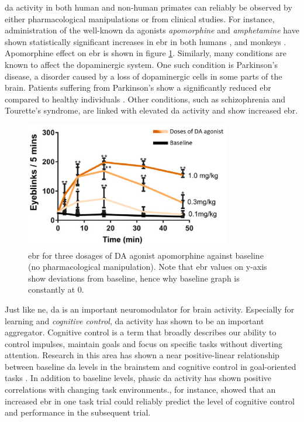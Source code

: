 \acrshort{da} activity in both human and non-human primates can reliably be observed by either pharmacological manipulations or from clinical studies. For instance, administration of the well-known \acrshort{da} agonists \textit{apomorphine} and \textit{amphetamine} have shown statistically significant increases in \acrshort{ebr} in both humans \cite{blin1990, strakowski1998, strakowski1996}, and monkeys \cite{redmond2011, kotani2016}. Apomorphine effect on \acrshort{ebr} is shown in figure \ref{fig:bt/da_corr}. Similarly, many conditions are known to affect the dopaminergic system. One such condition is Parkinson's disease, a disorder caused by a loss of dopaminergic cells in some parts of the brain. Patients suffering from Parkinson's show a significantly reduced \acrshort{ebr} compared to healthy individuals \cite{bologna2012}. Other conditions, such as schizophrenia and Tourette's syndrome, are linked with elevated \acrshort{da} activity and show increased \acrshort{ebr}. 

\begin{figure}[h]
    \centering
    \includegraphics[width=0.8\textwidth]{figures/bt_DA_correlation.png}
    \caption{\acrlong{ebr} for three dosages of DA agonist apomorphine against baseline (no pharmacological manipulation). Note that \acrshort{ebr} values on y-axis show deviations from baseline, hence why baseline graph is constantly at 0.}
    \label{fig:bt/da_corr}
\end{figure}

Just like \acrshort{ne}, \acrshort{da} is an important neuromodulator for brain activity. Especially for learning and \textit{cognitive control}, \acrshort{da} activity has shown to be an important aggregator. Cognitive control is a term that broadly describes our ability to control impulses, maintain goals and focus on specific tasks without diverting attention. Research in this area has shown a near positive-linear relationship between baseline \acrshort{da} levels in the brainstem and cognitive control in goal-oriented tasks \cite{puig2014, westbrook2016}. In addition to baseline levels, phasic \acrshort{da} activity has shown positive correlations with changing task environments.\textcite{bochove2012}, for instance, showed that an increased \acrshort{ebr} in one task trial could reliably predict the level of cognitive control and performance in the subsequent trial.

